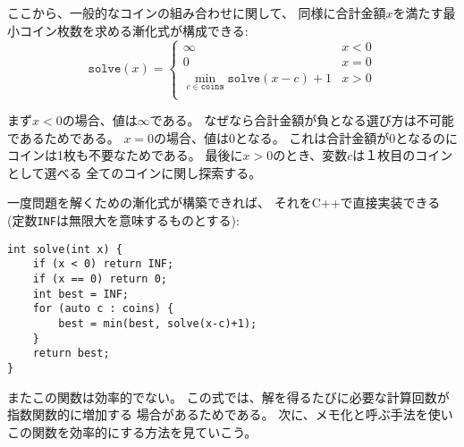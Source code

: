 ここから、一般的なコインの組み合わせに関して、
同様に合計金額$x$を満たす最小コイン枚数を求める漸化式が構成できる:
\begin{equation*}
    \texttt{solve}(x) = \begin{cases}
               \infty               & x < 0\\
               0               & x = 0\\
               \min_{c \in \texttt{coins}} \texttt{solve}(x-c)+1 & x > 0 \\
           \end{cases}
\end{equation*}

\begin{comment}
First, if $x<0$, the value is $\infty$,
because it is impossible to form a negative
sum of money.
Then, if $x=0$, the value is $0$,
because no coins are needed to form an empty sum.
Finally, if $x>0$, the variable $c$ goes through
all possibilities how to choose the first coin
of the sum.

Once a recursive function that solves the problem
has been found,
we can directly implement a solution in C++
(the constant \texttt{INF} denotes infinity):
\end{comment}

まず$x<0$の場合、値は$\infty$である。
なぜなら合計金額が負となる選び方は不可能であるためである。
$x=0$の場合、値は$0$となる。
これは合計金額が0となるのにコインは1枚も不要なためである。
最後に$x>0$のとき、変数$c$は１枚目のコインとして選べる
全てのコインに関し探索する。

一度問題を解くための漸化式が構築できれば、
それをC++で直接実装できる
(定数\texttt{INF}は無限大を意味するものとする):

\begin{lstlisting}
int solve(int x) {
    if (x < 0) return INF;
    if (x == 0) return 0;
    int best = INF;
    for (auto c : coins) {
        best = min(best, solve(x-c)+1);
    }
    return best;
}
\end{lstlisting}

\begin{comment}
Still, this function is not efficient,
because there may be an exponential number of ways
to construct the sum.
However, next we will see how to make the
function efficient using a technique called memoization.
\end{comment}

またこの関数は効率的でない。
この式では、解を得るたびに必要な計算回数が指数関数的に増加する
場合があるためである。
次に、メモ化と呼ぶ手法を使いこの関数を効率的にする方法を見ていこう。

